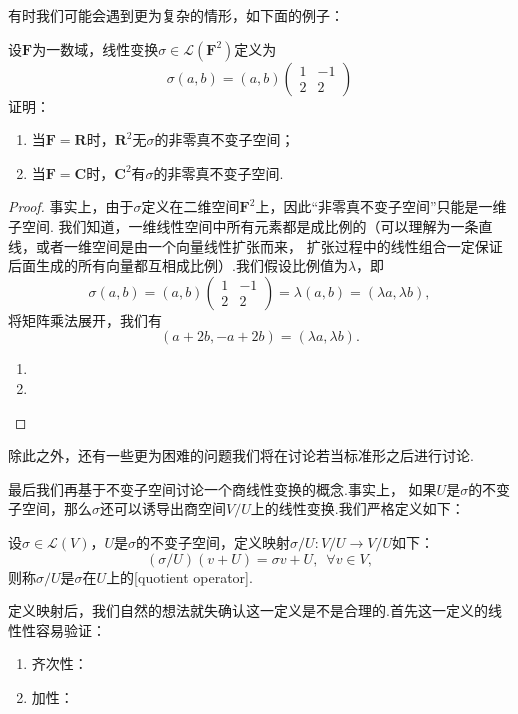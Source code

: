 有时我们可能会遇到更为复杂的情形，如下面的例子：
\begin{example}\label{ex:18:不变子空间}
    设$\mathbf{F}$为一数域，线性变换$\sigma\in\mathcal{L}(\mathbf{F}^2)$定义为
    \[\sigma(a,b)=(a,b)\begin{pmatrix}
        1 & -1 \\ 2 & 2
    \end{pmatrix}\]
    证明：
    \begin{enumerate}[label=(\arabic*)]
        \item 当$\mathbf{F}=\mathbf{R}$时，$\mathbf{R}^2$无$\sigma$的非零真不变子空间；

        \item 当$\mathbf{F}=\mathbf{C}$时，$\mathbf{C}^2$有$\sigma$的非零真不变子空间.
    \end{enumerate}
\end{example}
\begin{proof}
    事实上，由于$\sigma$定义在二维空间$\mathbf{F}^2$上，因此``非零真不变子空间''只能是一维子空间.
    我们知道，一维线性空间中所有元素都是成比例的（可以理解为一条直线，或者一维空间是由一个向量线性扩张而来，
    扩张过程中的线性组合一定保证后面生成的所有向量都互相成比例）.我们假设比例值为$\lambda$，即
    \[\sigma(a,b)=(a,b)\begin{pmatrix}
        1 & -1 \\ 2 & 2
    \end{pmatrix}=\lambda(a,b)=(\lambda a,\lambda b),\]
    将矩阵乘法展开，我们有
    \[(a+2b,-a+2b)=(\lambda a,\lambda b).\]
    \begin{enumerate}[label=(\arabic*)]
        \item 
        \item 
    \end{enumerate}
\end{proof}

除此之外，还有一些更为困难的问题我们将在讨论若当标准形之后进行讨论.

最后我们再基于不变子空间讨论一个商线性变换的概念.事实上，
如果$U$是$\sigma$的不变子空间，那么$\sigma$还可以诱导出商空间$V/U$上的线性变换.我们严格定义如下：
\begin{definition}
    设$\sigma\in \mathcal{L}(V)$，$U$是$\sigma$的不变子空间，定义映射$\sigma/U:V/U\to V/U$如下：
    \[(\sigma/U)(v+U)=\sigma v+U,\enspace\forall v\in V,\]
    则称$\sigma/U$是$\sigma$在$U$上的[quotient operator].
\end{definition}

定义映射后，我们自然的想法就失确认这一定义是不是合理的.首先这一定义的线性性容易验证：
\begin{enumerate}
    \item 齐次性：
    \item 加性：
\end{enumerate}

